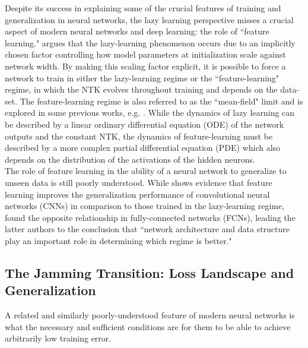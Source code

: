 \documentclass[a4paper, 12pt]{article}
\begin{document}
Despite its success in explaining some of the crucial features of training and generalization in neural networks, the lazy learning perspective misses a crucial aspect of modern neural networks and deep learning: the role of ``feature learning."  \cite{chizatLazyTrainingDifferentiable2020} argues that the lazy-learning phenomenon occurs due to an implicitly chosen factor controlling how model parameters at initialization scale against network width. By making this scaling factor explicit, it is possible to force a network to train in either the lazy-learning regime or the ``feature-learning" regime, in which the NTK evolves throughout training and depends on the data-set. The feature-learning regime is also referred to as the ``mean-field" limit and is explored in some previous works, e.g. \cite{meiMeanFieldView2018}. While the dynamics of lazy learning can be described by a linear ordinary differential equation (ODE) of the network outputs and the constant NTK, the dynamics of feature-learning must be described by a more complex partial differential equation (PDE) which also depends on the distribution of the activations of the hidden neurons.\\

 The role of feature learning in the ability of a neural network to generalize to unseen data is still poorly understood. While \cite{chizatLazyTrainingDifferentiable2020} shows evidence that feature learning improves the generalization performance of convolutional neural networks (CNNs) in comparison to those trained in the lazy-learning regime, \cite{dascoliDoubleTroubleDouble2020} found the opposite relationship in fully-connected networks (FCNs), leading the latter authors to the conclusion that ``network architecture and data structure play an important role in determining which regime is better."  











\subsection{The Jamming Transition: Loss Landscape and Generalization}

A related and similarly poorly-understood feature of modern neural networks is what the necessary and sufficient conditions are for them to be able to achieve arbitrarily low training error. 
\end{document}
